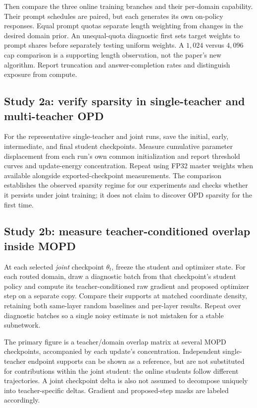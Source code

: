 Then compare the three online training branches and their per-domain
capability. Their prompt schedules are paired, but each generates its own
on-policy responses. Equal prompt quotas separate length weighting from
changes in the desired domain prior. An unequal-quota diagnostic first
sets target weights to prompt shares before separately testing uniform
weights. A $1{,}024$ versus $4{,}096$ cap comparison is a supporting
length observation, not the paper's new algorithm. Report truncation
and answer-completion rates and distinguish exposure from compute.

\subsection{Study 2a: verify sparsity in single-teacher and multi-teacher OPD}

For the representative single-teacher and joint runs, save the initial,
early, intermediate, and final student checkpoints. Measure cumulative
parameter displacement from each run's own common initialization and
report threshold curves and update-energy concentration. Repeat using
FP32 master weights when available alongside exported-checkpoint
measurements. The comparison establishes the observed sparsity regime
for our experiments and checks whether it persists under joint training;
it does not claim to discover OPD sparsity for the first time.

\subsection{Study 2b: measure teacher-conditioned overlap inside MOPD}

At each selected \emph{joint} checkpoint $\theta_t$, freeze the student
and optimizer state. For each routed domain, draw a diagnostic batch
from that checkpoint's student policy and compute its teacher-conditioned
raw gradient and proposed optimizer step on a separate copy. Compare
their supports at matched coordinate density, retaining both same-layer
random baselines and per-layer results. Repeat over diagnostic batches
so a single noisy estimate is not mistaken for a stable subnetwork.

The primary figure is a teacher/domain overlap matrix at several MOPD
checkpoints, accompanied by each update's concentration. Independent
single-teacher endpoint supports can be shown as a reference, but are
not substituted for contributions within the joint student: the online
students follow different trajectories. A joint checkpoint delta is
also not assumed to decompose uniquely into teacher-specific deltas.
Gradient and proposed-step masks are labeled accordingly.


